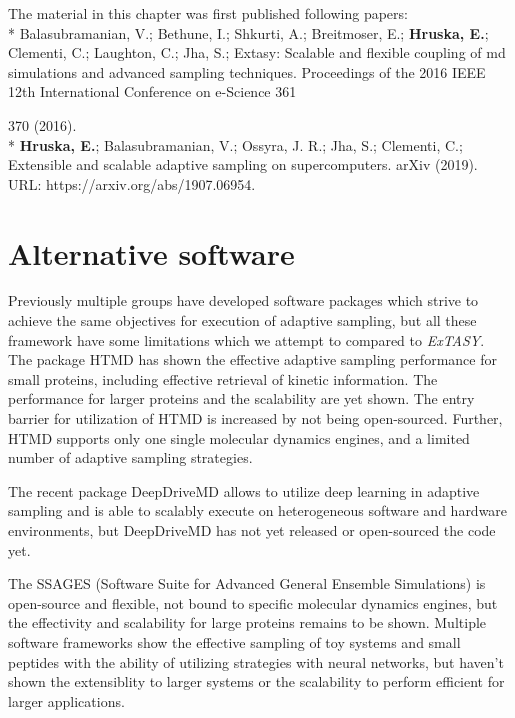 The material in this chapter was first published following papers: 
\\*
\cite{Extasy2016} Balasubramanian, V.; Bethune, I.; Shkurti, A.; Breitmoser, E.; \textbf{Hruska, E.}; Clementi, C.; Laughton, C.; Jha, S.; Extasy: Scalable and flexible coupling of md simulations
and advanced sampling techniques. Proceedings of the 2016 IEEE 12th
International Conference on e-Science 361{370 (2016).
\\*
\cite{Extasy2019} \textbf{Hruska, E.}; Balasubramanian, V.; Ossyra, J. R.; Jha, S.; Clementi, C.; Extensible
and scalable adaptive sampling on supercomputers. arXiv (2019). URL: https://arxiv.org/abs/1907.06954.


\section{\label{sec:alternative4}Alternative software}

Previously multiple groups have developed software packages which strive to achieve the same objectives for execution of adaptive sampling, but all these framework have some limitations which we attempt to  compared to \emph{ExTASY}.
The package HTMD\cite{doerr2016htmd} has shown the effective adaptive sampling performance for small proteins, including effective retrieval of kinetic information. The performance for larger proteins and the scalability are yet shown. The entry barrier for utilization of HTMD is increased by not being open-sourced. Further, HTMD supports only one single molecular dynamics engines, and a limited number of adaptive sampling strategies.

The recent package DeepDriveMD \cite{leeDeepDriveMDDeepLearningDriven2019} allows to utilize deep learning in adaptive sampling and is able to scalably execute on heterogeneous software and hardware environments, but DeepDriveMD has not yet released or open-sourced the code yet. 

The SSAGES (Software Suite for Advanced General Ensemble Simulations) \cite{SSAGES} is open-source and flexible, not bound to specific molecular dynamics engines, but the effectivity and scalability for large proteins remains to be shown. Multiple software frameworks \cite{jung2019acp, ribeiro2018tjocp, bonati2019pnasu} show the effective sampling of toy systems and small peptides with the ability of utilizing strategies with neural networks, but haven't shown the extensiblity to larger systems or the scalability to perform efficient for larger applications. 



}
